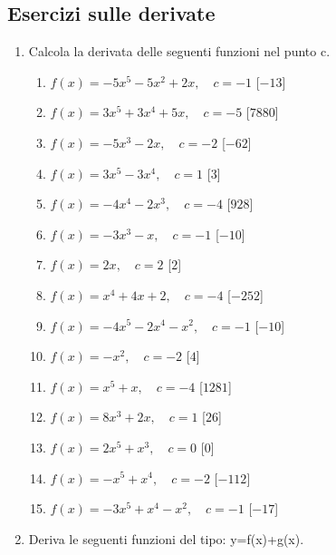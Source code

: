 \subsection{Esercizi sulle derivate}
\begin{enumerate}

\item Calcola la derivata delle seguenti funzioni nel punto c.

\begin{enumerate}
\item \(f(x)= - 5 x^{5} - 5 x^{2} + 2 x,\quad c=-1\) \hfill [\(-13\)]
\item \(f(x)= 3 x^{5} + 3 x^{4} + 5 x,\quad c=-5\) \hfill [\(7880\)]
\item \(f(x)= - 5 x^{3} - 2 x,\quad c=-2\) \hfill [\(-62\)]
\item \(f(x)= 3 x^{5} - 3 x^{4},\quad c=1\) \hfill [\(3\)]
\item \(f(x)= - 4 x^{4} - 2 x^{3},\quad c=-4\) \hfill [\(928\)]
\item \(f(x)= - 3 x^{3} - x,\quad c=-1\) \hfill [\(-10\)]
\item \(f(x)= 2 x,\quad c=2\) \hfill [\(2\)]
\item \(f(x)= x^{4} + 4 x + 2,\quad c=-4\) \hfill [\(-252\)]
\item \(f(x)= - 4 x^{5} - 2 x^{4} - x^{2},\quad c=-1\) \hfill [\(-10\)]
\item \(f(x)= - x^{2},\quad c=-2\) \hfill [\(4\)]
\item \(f(x)= x^{5} + x,\quad c=-4\) \hfill [\(1281\)]
\item \(f(x)= 8 x^{3} + 2 x,\quad c=1\) \hfill [\(26\)]
\item \(f(x)= 2 x^{5} + x^{3},\quad c=0\) \hfill [\(0\)]
\item \(f(x)= - x^{5} + x^{4},\quad c=-2\) \hfill [\(-112\)]
\item \(f(x)= - 3 x^{5} + x^{4} - x^{2},\quad c=-1\) \hfill [\(-17\)]
 \end{enumerate}


\item Deriva le seguenti funzioni del tipo: y=f(x)+g(x).


\end{enumerate}
